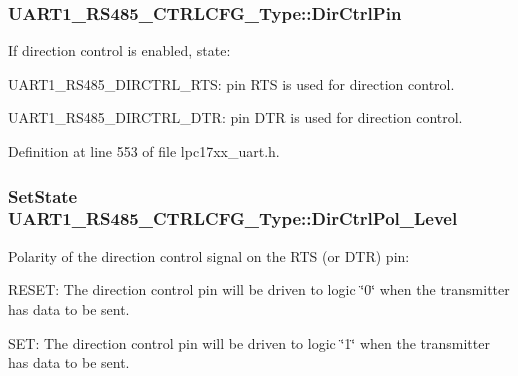 \hypertarget{struct_u_a_r_t1___r_s485___c_t_r_l_c_f_g___type_acfebf68b0964d3117933ff33be054227}{
\subsubsection[{\-Dir\-Ctrl\-Pin}]{ {\bf \-U\-A\-R\-T1\-\_\-\-R\-S485\-\_\-\-C\-T\-R\-L\-C\-F\-G\-\_\-\-Type\-::\-Dir\-Ctrl\-Pin}}}\label{struct_u_a_r_t1___r_s485___c_t_r_l_c_f_g___type_acfebf68b0964d3117933ff33be054227}
\-If direction control is enabled, state\-:
\begin{DoxyItemize}
\item \-U\-A\-R\-T1\-\_\-\-R\-S485\-\_\-\-D\-I\-R\-C\-T\-R\-L\-\_\-\-R\-T\-S\-: pin \-R\-T\-S is used for direction control.
\item \-U\-A\-R\-T1\-\_\-\-R\-S485\-\_\-\-D\-I\-R\-C\-T\-R\-L\-\_\-\-D\-T\-R\-: pin \-D\-T\-R is used for direction control. 
\end{DoxyItemize}

\-Definition at line 553 of file lpc17xx\-\_\-uart.\-h.

\hypertarget{struct_u_a_r_t1___r_s485___c_t_r_l_c_f_g___type_a8ef36fc7dfce726385b7114fb8429589}{
\subsubsection[{\-Dir\-Ctrl\-Pol\-\_\-\-Level}]{\setlength{\rightskip}{0pt plus 5cm}\-Set\-State {\bf \-U\-A\-R\-T1\-\_\-\-R\-S485\-\_\-\-C\-T\-R\-L\-C\-F\-G\-\_\-\-Type\-::\-Dir\-Ctrl\-Pol\-\_\-\-Level}}}\label{struct_u_a_r_t1___r_s485___c_t_r_l_c_f_g___type_a8ef36fc7dfce726385b7114fb8429589}
\-Polarity of the direction control signal on the \-R\-T\-S (or \-D\-T\-R) pin\-:
\begin{DoxyItemize}
\item \-R\-E\-S\-E\-T\-: \-The direction control pin will be driven to logic \char`\"{}0\char`\"{} when the transmitter has data to be sent.
\item \-S\-E\-T\-: \-The direction control pin will be driven to logic \char`\"{}1\char`\"{} when the transmitter has data to be sent. 
\end{DoxyItemize}

